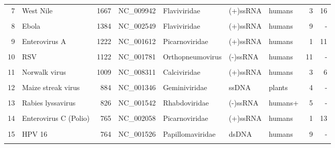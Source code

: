 \begin{tabular}{r|l|r|l|l|l|l|r|r}
     7 & West Nile          &        1667  & NC\_009942      & Flaviviridae   & (+)ssRNA & humans &     3 &      16  \\
       &                    &              &                &                &          &        &       &          \\ 
     8 & Ebola              &        1384  & NC\_002549      & Flaviviridae   & (+)ssRNA & humans &     9 &       -  \\
       &                    &              &                &                &          &        &       &          \\ 
     9 & Enterovirus A      &        1222  & NC\_001612      & Picarnoviridae & (+)ssRNA & humans &     1 &      11  \\
       &                    &              &                &                &          &        &       &          \\ 
    10 & RSV                &        1122  & NC\_001781      & Orthopneumovirus& (-)ssRNA & humans &    11 &       -  \\
       &                    &              &                &                &          &        &       &          \\ 
    11 & Norwalk virus      &        1009  & NC\_008311      & Calciviridae  & (+)ssRNA & humans &     3 &       6  \\ 
       &                    &              &                &                &          &        &       &          \\ 
    12 & Maize streak virus &         884  & NC\_001346      & Geminiviridae  & ssDNA    & plants &     4 &      -   \\
       &                    &              &                &                &          &        &       &          \\ 
    13 & Rabies lyssavirus  &         826  & NC\_001542      & Rhabdoviridae  & (-)ssRNA & humans+&     5 &      -   \\
       &                    &              &                &                &          &        &       &          \\ 
    14 & Enterovirus C (Polio) &      765  & NC\_002058      & Picarnoviridae & (+)ssRNA & humans &     1 &      13  \\
       &                    &              &                &                &          &        &       &          \\ 
    15 & HPV 16             &         764  & NC\_001526      & Papillomaviridae& dsDNA    & humans &     9 &       -  \\
       &                    &              &                &                &          &        &       &          \\ 
\end{tabular}
